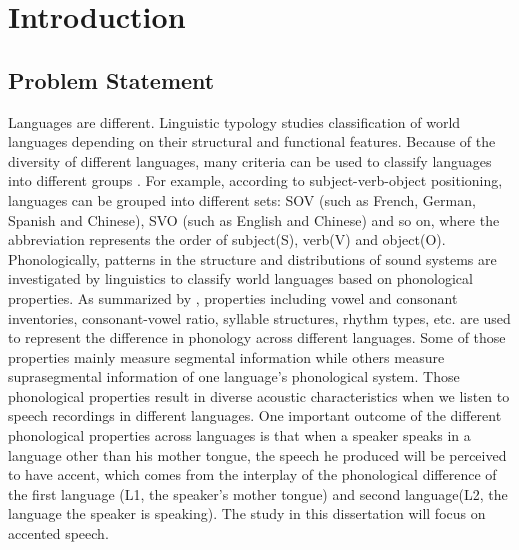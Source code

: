 \chapter{Introduction}
\label{introduction}

\section{Problem Statement}
Languages are different. Linguistic typology studies classification of world languages depending on their structural and functional features. Because of the diversity of different languages, many criteria can be used to classify languages into different groups \citep{wals}. For example, according to subject-verb-object positioning, languages can be grouped into different sets: SOV (such as French, German, Spanish and Chinese), SVO (such as English and Chinese) and so on, where the abbreviation represents the order of subject(S), verb(V) and object(O). Phonologically, patterns in the structure and distributions of sound systems are investigated by linguistics to classify world languages based on phonological properties. As summarized by \cite{wals}, properties including vowel and consonant inventories, consonant-vowel ratio, syllable structures, rhythm types, etc. are used to represent the difference in phonology across different languages. Some of those properties mainly measure segmental information while others measure suprasegmental information of one language's phonological system. Those phonological properties result in diverse acoustic characteristics when we listen to speech recordings in different languages. One important outcome of the different phonological properties across languages is that when a speaker speaks in a language other than his mother tongue, the speech he produced will be perceived to have accent, which comes from the interplay of the phonological difference of the first language (L1, the speaker's mother tongue) and second language(L2, the language the speaker is speaking). The study in this dissertation will focus on accented speech.

